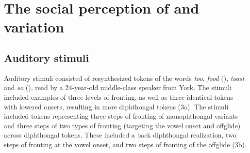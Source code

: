 \documentclass[PWPL]{article}
\begin{document}
\section{The social perception of  and  variation}

\subsection{Auditory stimuli}

Auditory stimuli consisted of resynthesized tokens of the words \textit{too}, \textit{food} (), \textit{toast} and \textit{so} (), read by a 24-year-old middle-class speaker from York. The  stimuli included examples of three levels of fronting, as well as three identical tokens with lowered onsets, resulting in more diphthongal tokens (3a). The  stimuli included tokens representing three steps of fronting of monophthongal variants and three steps of two types of fronting (targeting the vowel onset and offglide) across diphthongal tokens. These included a back diphthongal realization, two steps of fronting at the vowel onset, and two steps of fronting of the offglide (3b). 
\end{document}
